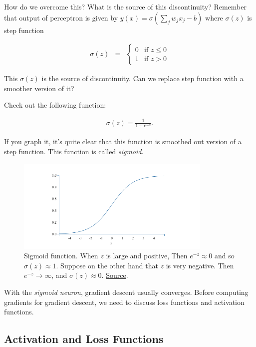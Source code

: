 \documentclass[a4paper]{tufte-handout}
\begin{document}
How do we overcome this? What is the source of this discontinuity?
Remember that output of perceptron is given by
\(y(x) = \sigma\left(\sum_j w_j x_j - b\right)\) where \(\sigma(z)\) is
step function

\begin{eqnarray*}
  \sigma(z) & = & \left\{ \begin{array}{ll}
      0 & \mbox{if } z \leq 0 \\
      1 & \mbox{if } z > 0
      \end{array} \right.
\end{eqnarray*}

This \(\sigma(z)\) is the source of discontinuity. Can we replace
step function with a smoother version of it?

Check out the following function:

\begin{eqnarray*} 
  \sigma(z) = \frac{1}{1+e^{-z}}.
\end{eqnarray*}

If you graph it, it's quite clear that this function is smoothed out
version of a step function. This function is called \emph{sigmoid}.

\begin{figure}
  \includegraphics[height=45mm]{sigmoid}
  \caption{Sigmoid function. When \(z\) is large and
  positive, Then \(e^{-z} \approx 0\) and so \(\sigma(z) \approx 1\).
  Suppose on the other hand that \(z\) is very negative. Then
  \(e^{-z} \rightarrow \infty\), and \(\sigma(z) \approx 0\).
  \href{http://neuralnetworksanddeeplearning.com/chap1.html}{Source}.}
\end{figure}

With the \emph{sigmoid neuron}, gradient descent usually converges.
Before computing gradients for gradient descent, we need to discuss loss
functions and activation functions.


\subsection{Activation and Loss
Functions}\label{activation-and-loss-functions}
\end{document}
